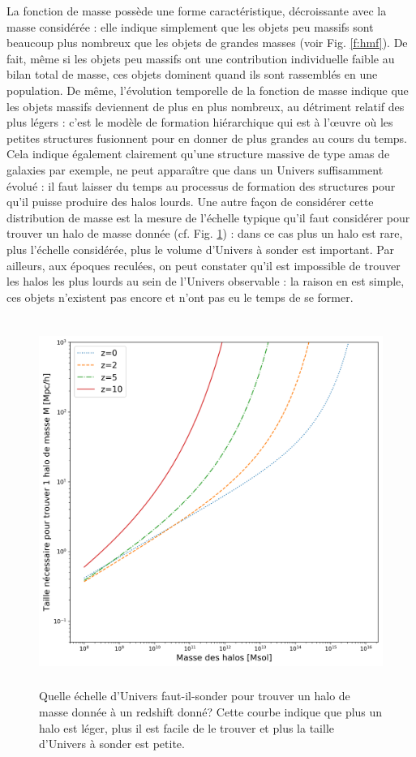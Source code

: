La fonction de masse possède une forme caractéristique, décroissante avec la masse considérée : elle indique simplement que les objets peu massifs sont beaucoup plus nombreux que les objets de grandes masses (voir Fig. \ref{f:hmf}). De fait, même si les objets peu massifs ont une contribution individuelle faible au bilan total de masse, ces objets dominent quand ils sont rassemblés en une population. De même, l’évolution temporelle de la fonction de masse indique que les objets massifs deviennent de plus en plus nombreux, au détriment relatif des plus légers : c'est le modèle de formation hiérarchique qui est à l'œuvre où les petites structures fusionnent pour en donner de plus grandes au cours du temps. Cela indique également clairement qu'une structure massive de type amas de galaxies par exemple, ne peut apparaître que dans un Univers suffisamment évolué : il faut laisser du temps au processus de formation des structures pour qu'il puisse produire des halos lourds. Une autre façon de considérer cette distribution de masse est la mesure de l'échelle typique qu'il faut considérer pour trouver un halo de masse donnée (cf. Fig. \ref{f:L}) : dans ce cas plus un halo est rare, plus l'échelle considérée, plus le volume d'Univers à sonder est important. Par ailleurs, aux époques reculées, on peut constater qu'il est impossible de trouver les halos les plus lourds au sein de l'Univers observable : la raison en est simple, ces objets n'existent pas encore et n'ont pas eu le temps de se former.

\begin{figure}[htbp]
	\centering
		\includegraphics[height=12cm]{figs/L.png}
	\caption[Quelle échelle d'Univers faut-il-sonder pour trouver un halo de masse donnée à une époque donnée?]{Quelle échelle d'Univers faut-il-sonder pour trouver un halo de masse donnée à un redshift donné? Cette courbe indique que plus un halo est léger, plus il est facile de le trouver et plus la taille d'Univers à sonder est petite.} 
	\label{f:L}
\end{figure}

